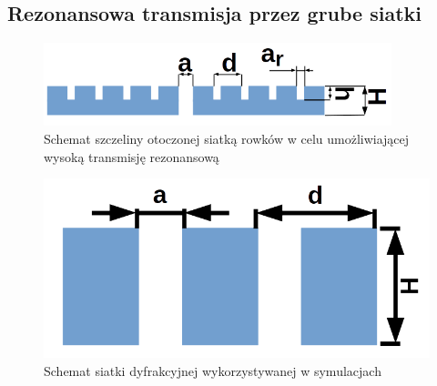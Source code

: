 \subsection{Rezonansowa transmisja przez grube siatki}
\label{subart:rezo-grating}

\begin{figure}[tb]
	\centering
	\includegraphics[width=0.9\textwidth]{images/thz/schemat-1szczelina.png}
	\caption{Schemat szczeliny otoczonej siatką rowków w celu umożliwiającej wysoką transmisję rezonansową}
	\label{fig:szczelina-schem}
\end{figure}

\begin{figure}[bt]
	\includegraphics[width=\textwidth]{images/thz/schemat-siatka.png}
	\caption{Schemat siatki dyfrakcyjnej wykorzystywanej w symulacjach}
	\label{fig:rezo-siat-H}
\end{figure}

